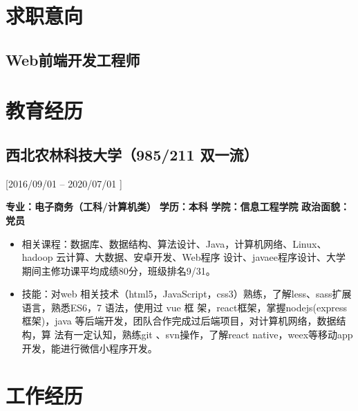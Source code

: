 \documentclass{mycv}
\begin{document}
\maketitle%

\section{求职意向}

\subsection{Web前端开发工程师}

\section{教育经历}
\subsection{西北农林科技大学（985/211 双一流）}[2016/09/01 – 2020/07/01 ]

\textbf{专业：电子商务（工科/计算机类）}  \hspace{1.5em}   \textbf{学历：本科}  \hspace{1.5em}   \textbf{学院：信息工程学院}   \hspace{1.5em}  \textbf{政治面貌：党员}

\begin{itemize}
  \item 相关课程：数据库、数据结构、算法设计、Java，计算机网络、Linux、hadoop 云计算、大数据、安卓开发、Web程序
        设计、javaee程序设计、大学期间主修功课平均成绩80分，班级排名9/31。
  \item 技能：对web 相关技术（html5，JavaScript，css3）熟练，了解less、sass扩展语言，熟悉ES6，7 语法，使用过 vue 框
        架，react框架，掌握nodejs(express 框架)，java 等后端开发，团队合作完成过后端项目，对计算机网络，数据结构，算
        法有一定认知，熟练git 、svn操作，了解react native，weex等移动app开发，能进行微信小程序开发。
\end{itemize}

\section{工作经历}
\end{document}

